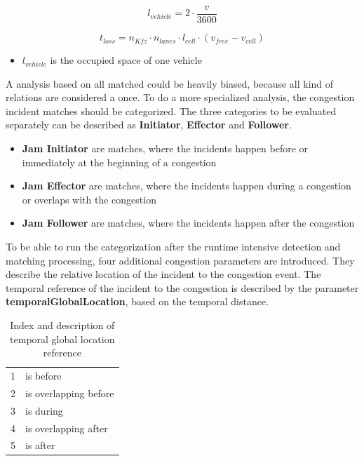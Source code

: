 \begin{equation}
	l_{vehicle} = 2 \cdot \frac{v}{3600}
\end{equation}




\begin{equation}
	t_{loss} = n_{Kfz} \cdot n_{lanes} \cdot l_{cell} \cdot ( v_{free} - v_{cell})
\end{equation}

\smallskip

\begin{itemize}
	\setlength\itemsep{0.1em}	
	\item[] $l_{vehicle}$ is the occupied space of one vehicle
\end{itemize}

A analysis based on all matched could be heavily biased, because all kind of relations are considered a once. To do a more specialized analysis, the congestion incident matches should be categorized. The three categories to be evaluated separately can be described as \textbf{Initiator}, \textbf{Effector} and \textbf{Follower}.
\begin{itemize}
	\setlength\itemsep{0.1em}	
	\item[] \textbf{Jam Initiator} are matches, where the incidents happen before or immediately at the beginning of a congestion
	\item[] \textbf{Jam Effector} are matches, where the incidents happen during a congestion or overlaps with the congestion
	\item[] \textbf{Jam Follower} are matches, where the incidents happen after the congestion
\end{itemize}

To be able to run the categorization after the runtime intensive detection and matching processing, four additional congestion parameters are introduced. They describe the relative location of the incident to the congestion event. The temporal reference of the incident to the congestion is described by the parameter \textbf{temporalGlobalLocation}, based on the temporal distance. 
\noindent
\begin{table}[ht]
	\centering
	\begin{tabular}{c|l}  
		1 & is before \\ 
 		2 & is overlapping before \\ 
 		3 & is during \\
 		4 & is overlapping after \\
 		5 & is after \\
	\end{tabular}
	\caption{Index and description of temporal global location reference}
\end{table}

